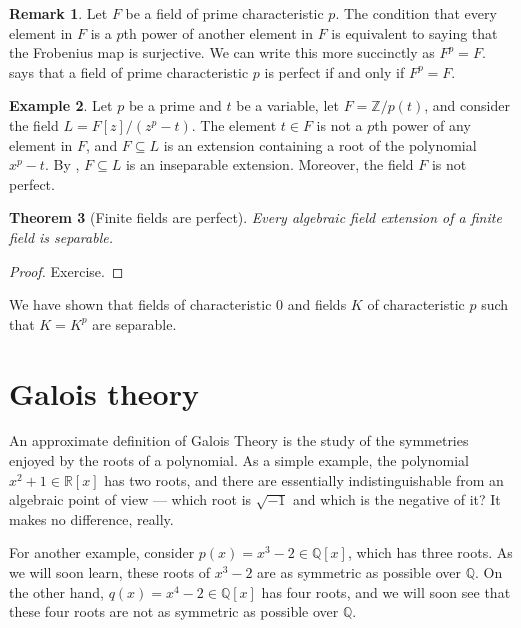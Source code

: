 \documentclass[12pt]{report}
\newtheorem{theorem}{Theorem}[chapter]
\numberwithin{equation}{section}
\numberwithin{theorem}{chapter}
\theoremstyle{definition}
\newtheorem{example}[theorem]{Example}
\newtheorem*{basic properties}{Basic Properties}
\newtheorem*{Important Remark}{Important Remark}
\newtheorem{remark}[theorem]{Remark}
\begin{document}
\begin{remark}
	Let $F$ be a field of prime characteristic $p$.	The condition that every element in $F$ is a $p$th power of another element in $F$ is equivalent to saying that the Frobenius map is surjective. We can write this more succinctly as $F^p = F$.  says that a field of prime characteristic $p$ is perfect if and only if $F^p = F$.
\end{remark}

\begin{example}
	Let $p$ be a prime and $t$ be a variable, let $F = \mathbb{Z}/p(t)$, and consider the field $L = F[z]/(z^p-t)$. The element $t \in F$ is not a $p$th power of any element in $F$, and $F \subseteq L$ is an extension containing a root of the polynomial $x^p-t$. By , $F \subseteq L$ is an inseparable extension. Moreover, the field $F$ is not perfect.
\end{example}


\begin{theorem}[Finite fields are perfect]\label{alg ext finite field separable}
 Every algebraic field extension of a finite field is separable.
\end{theorem}


\begin{proof}
Exercise.
\end{proof}


We have shown that fields of characteristic $0$ and fields $K$ of characteristic $p$ such that $K=K^p$ are separable.






\chapter{Galois theory}



An approximate definition of Galois Theory is the study of the symmetries enjoyed by the roots of a polynomial. As a simple example, the polynomial $x^2 + 1 \in \mathbb{R}[x]$ has two roots, and there are essentially indistinguishable from an algebraic point of view --- which root is $\sqrt{-1}$ and which is the negative of it? It makes no difference, really.

For another example, consider $p(x) = x^3 -2 \in \mathbb{Q}[x]$, which has three roots. As we will soon learn, these roots of $x^3 - 2$ are as symmetric as possible over $\mathbb{Q}$. On the other hand, $q(x) = x^4 - 2 \in \mathbb{Q}[x]$ has four roots, and we will soon see that these four roots are not as symmetric as possible over $\mathbb{Q}$. 
\end{document}
